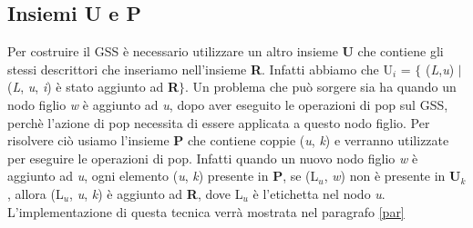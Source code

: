 \subsection{Insiemi U e P}
Per costruire il GSS è necessario utilizzare un altro insieme \textbf{U} che contiene gli stessi descrittori che inseriamo nell'insieme \textbf{R}. Infatti abbiamo che U$_i$ = $\{$ (\textit{L},\textit{u}) $\mid$ (\textit{L}, \textit{u}, \textit{i}) è stato aggiunto ad \textbf{R}$\}$. Un problema \cite{pubblicazione: scott} che può sorgere sia ha quando un nodo figlio \textit{w} è aggiunto ad \textit{u}, dopo aver eseguito le operazioni di pop sul GSS, perchè l'azione di pop necessita di essere applicata a questo nodo figlio. Per risolvere ciò usiamo l'insieme \textbf{P} che contiene coppie (\textit{u}, \textit{k}) e verranno utilizzate per eseguire le operazioni di pop. Infatti quando un nuovo nodo figlio \textit{w} è aggiunto ad \textit{u}, ogni elemento (\textit{u}, \textit{k}) presente in \textbf{P}, se (L$_u$, \textit{w}) non è presente in \textbf{U$_k$}, allora (L$_u$, \textit{u}, \textit{k}) è aggiunto ad \textbf{R}, dove L$_u$ è l'etichetta nel nodo \textit{u}. L'implementazione di questa tecnica verrà mostrata nel paragrafo \ref{par}  
